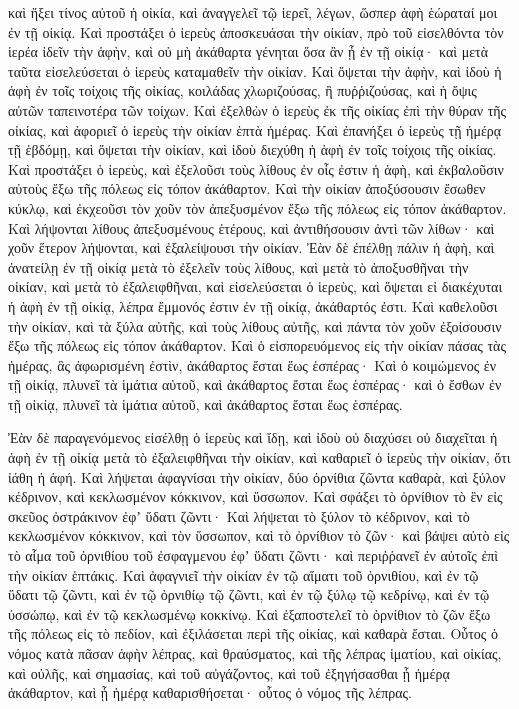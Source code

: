 {καὶ ἥξει τίνος αὐτοῦ ἡ οἰκία, καὶ ἀναγγελεῖ τῷ ἱερεῖ, λέγων, ὥσπερ ἁφὴ ἑώραταί μοι ἐν τῇ οἰκίᾳ.
Καὶ προστάξει ὁ ἱερεὺς ἀποσκευάσαι τὴν οἰκίαν, πρὸ τοῦ εἰσελθόντα τὸν ἱερέα ἰδεῖν τὴν ἁφὴν, καὶ οὐ μὴ ἀκάθαρτα γένηται ὅσα ἂν ᾖ ἐν τῇ οἰκίᾳ· καὶ μετὰ ταῦτα εἰσελεύσεται ὁ ἱερεὺς καταμαθεῖν τὴν οἰκίαν.
Καὶ ὄψεται τὴν ἁφὴν, καὶ ἰδοὺ ἡ ἁφὴ ἐν τοῖς τοίχοις τῆς οἰκίας, κοιλάδας χλωριζούσας, ἢ πυῤῥιζούσας, καὶ ἡ ὄψις αὐτῶν ταπεινοτέρα τῶν τοίχων.
Καὶ ἐξελθὼν ὁ ἱερεὺς ἐκ τῆς οἰκίας ἐπὶ τὴν θύραν τῆς οἰκίας, καὶ ἀφοριεῖ ὁ ἱερεὺς τὴν οἰκίαν ἑπτὰ ἡμέρας.
Καὶ ἐπανήξει ὁ ἱερεὺς τῇ ἡμέρᾳ τῇ ἑβδόμῃ, καὶ ὄψεται τὴν οἰκίαν, καὶ ἰδοὺ διεχύθη ἡ ἁφὴ ἐν τοῖς τοίχοις τῆς οἰκίας.
Καὶ προστάξει ὁ ἱερεὺς, καὶ ἐξελοῦσι τοὺς λίθους ἐν οἷς ἐστιν ἡ ἁφὴ, καὶ ἐκβαλοῦσιν αὐτοὺς ἔξω τῆς πόλεως εἰς τόπον ἀκάθαρτον.
Καὶ τὴν οἰκίαν ἀποξύσουσιν ἔσωθεν κύκλῳ, καὶ ἐκχεοῦσι τὸν χοῦν τὸν ἀπεξυσμένον ἔξω τῆς πόλεως εἰς τόπον ἀκάθαρτον.
Καὶ λήψονται λίθους ἀπεξυσμένους ἑτέρους, καὶ ἀντιθήσουσιν ἀντὶ τῶν λίθων· καὶ χοῦν ἕτερον λήψονται, καὶ ἐξαλείψουσι τὴν οἰκίαν.
Ἐὰν δὲ ἐπέλθῃ πάλιν ἡ ἁφὴ, καὶ ἀνατείλῃ ἐν τῇ οἰκίᾳ μετὰ τὸ ἐξελεῖν τοὺς λίθους, καὶ μετὰ τὸ ἀποξυσθῆναι τὴν οἰκίαν, καὶ μετὰ τὸ ἐξαλειφθῆναι,
καὶ εἰσελεύσεται ὁ ἱερεὺς, καὶ ὄψεται εἰ διακέχυται ἡ ἁφὴ ἐν τῇ οἰκίᾳ, λέπρα ἔμμονός ἐστιν ἐν τῇ οἰκίᾳ, ἀκάθαρτός ἐστι.
Καὶ καθελοῦσι τὴν οἰκίαν, καὶ τὰ ξύλα αὐτῆς, καὶ τοὺς λίθους αὐτῆς, καὶ πάντα τὸν χοῦν ἐξοίσουσιν ἔξω τῆς πόλεως εἰς τόπον ἀκάθαρτον.
Καὶ ὁ εἰσπορευόμενος εἰς τὴν οἰκίαν πάσας τὰς ἡμέρας, ἃς ἀφωρισμένη ἐστὶν, ἀκάθαρτος ἔσται ἕως ἑσπέρας·
Καὶ ὁ κοιμώμενος ἐν τῇ οἰκίᾳ, πλυνεῖ τὰ ἱμάτια αὐτοῦ, καὶ ἀκάθαρτος ἔσται ἕως ἑσπέρας· καὶ ὁ ἔσθων ἐν τῇ οἰκίᾳ, πλυνεῖ τὰ ἱμάτια αὐτοῦ, καὶ ἀκάθαρτος ἔσται ἕως ἑσπέρας.
\par }{\PP {}Ἐὰν δὲ παραγενόμενος εἰσέλθῃ ὁ ἱερεὺς καὶ ἴδῃ, καὶ ἰδοὺ οὐ διαχύσει οὐ διαχεῖται ἡ ἁφὴ ἐν τῇ οἰκίᾳ μετὰ τὸ ἐξαλειφθῆναι τὴν οἰκίαν, καὶ καθαριεῖ ὁ ἱερεὺς τὴν οἰκίαν, ὅτι ἰάθη ἡ ἁφή.
Καὶ λήψεται ἀφαγνίσαι τὴν οἰκίαν, δύο ὀρνίθια ζῶντα καθαρὰ, καὶ ξύλον κέδρινον, καὶ κεκλωσμένον κόκκινον, καὶ ὕσσωπον.
Καὶ σφάξει τὸ ὀρνίθιον τὸ ἓν εἰς σκεῦος ὀστράκινον ἐφʼ ὕδατι ζῶντι·
Καὶ λήψεται τὸ ξύλον τὸ κέδρινον, καὶ τὸ κεκλωσμένον κόκκινον, καὶ τὸν ὕσσωπον, καὶ τὸ ὀρνίθιον τὸ ζῶν· καὶ βάψει αὐτὸ εἰς τὸ αἷμα τοῦ ὀρνιθίου τοῦ ἐσφαγμενου ἐφʼ ὕδατι ζῶντι· καὶ περιῤῥανεῖ ἐν αὐτοῖς ἐπὶ τὴν οἰκίαν ἑπτάκις.
Καὶ ἀφαγνιεῖ τὴν οἰκίαν ἐν τῷ αἵματι τοῦ ὀρνιθίου, καὶ ἐν τῷ ὕδατι τῷ ζῶντι, καὶ ἐν τῷ ὀρνιθίῳ τῷ ζῶντι, καὶ ἐν τῷ ξύλῳ τῷ κεδρίνῳ, καὶ ἐν τῷ ὑσσώπῳ, καὶ ἐν τῷ κεκλωσμένῳ κοκκίνῳ.
Καὶ ἐξαποστελεῖ τὸ ὀρνίθιον τὸ ζῶν ἔξω τῆς πόλεως εἰς τὸ πεδίον, καὶ ἐξιλάσεται περὶ τῆς οἰκίας, καὶ καθαρὰ ἔσται.
Οὗτος ὁ νόμος κατὰ πᾶσαν ἁφὴν λέπρας, καὶ θραύσματος,
καὶ τῆς λέπρας ἱματίου, καὶ οἰκίας,
καὶ οὐλῆς, καὶ σημασίας, καὶ τοῦ αὐγάζοντος,
καὶ τοῦ ἐξηγήσασθαι ᾗ ἡμέρᾳ ἀκάθαρτον, καὶ ᾗ ἡμέρᾳ καθαρισθήσεται· οὗτος ὁ νόμος τῆς λέπρας.

}
